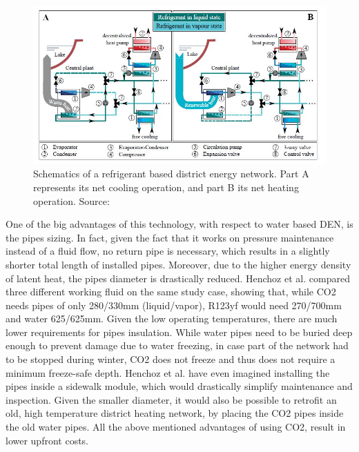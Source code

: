 \documentclass{article}
\begin{document}
\begin{figure}[h!]
\centering
\includegraphics[width=1\textwidth]{CO2schema.JPG}
\caption{Schematics of a refrigerant based district energy network. Part A represents its net cooling operation, and part B its net heating operation. Source: \cite{henchozPotentialRefrigerantBased}}
\label{fig:CO2schema}
\end{figure}

One of the big advantages of this technology, with respect to water based DEN, is the pipes sizing. In fact, given the fact that it works on pressure maintenance instead of a fluid flow, no return pipe is necessary, which results in a slightly shorter total length of installed pipes. Moreover, due to the higher energy density of latent heat, the pipes diameter is drastically reduced. Henchoz et al. \cite{henchozPotentialRefrigerantBased} compared three different working fluid on the same study case, showing that, while CO2 needs pipes of only 280/330mm (liquid/vapor), R123yf would need 270/700mm and water 625/625mm. Given the low operating temperatures, there are much lower requirements for pipes insulation. While water pipes need to be buried deep enough to prevent damage due to water freezing, in case part of the network had to be stopped during winter, CO2 does not freeze and thus does not require a minimum freeze-safe depth. Henchoz et al. have even imagined installing the pipes inside a sidewalk module, which would drastically simplify maintenance and inspection. Given the smaller diameter, it would also be possible to retrofit an old, high temperature district heating network, by placing the CO2 pipes inside the old water pipes. All the above mentioned advantages of using CO2, result in lower upfront costs. \\
\end{document}
